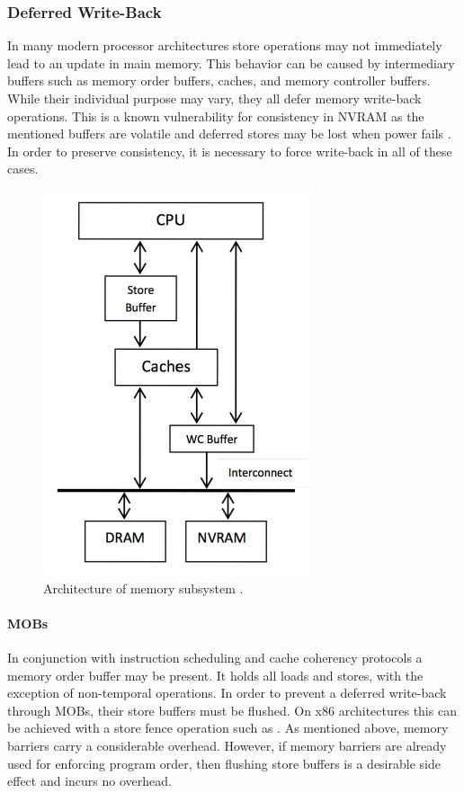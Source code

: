 \subsubsection{Deferred Write-Back}

In many modern processor architectures store operations may not immediately
lead to an update in main memory. This behavior can be caused by intermediary
buffers such as memory order buffers, caches, and memory controller buffers.
While their individual purpose may vary, they all defer memory write-back
operations. This is a known vulnerability for consistency in \ac{NVRAM} as the
mentioned buffers are volatile and deferred stores may be lost when power fails
\cite{condit2009better, oukid2017data}. In order to preserve consistency, it is
necessary to force write-back in all of these cases.

\begin{figure}[h!]
    \centering
    \includegraphics[scale=0.75]{figures/nvram-memory-subsystem.pdf}
    \caption{Architecture of memory subsystem \cite{bhandari2012implications}.}
    \label{fig:memory-interface}
\end{figure}

\paragraph{\acp{MOB}}

In conjunction with instruction scheduling and cache coherency protocols a
memory order buffer may be present. It holds all loads and stores, with the
exception of non-temporal operations. In order to prevent a deferred write-back
through \acp{MOB}, their store buffers must be flushed. On x86
architectures this can be achieved with a store fence operation such as
. As mentioned above, memory barriers carry a considerable
overhead. However, if memory barriers are already used for enforcing program
order, then flushing store buffers is a desirable side effect and incurs no
overhead.

